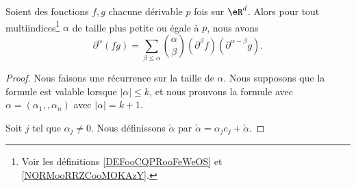 \begin{lemma}      \label{LEMooOLQTooEHJuBc}
	Soient des fonctions \( f,g\) chacune dérivable \( p\) fois sur \( \eR^d\). Alors pour tout multiindices\footnote{Voir les définitions \ref{DEFooCQPRooFeWeOS} et \ref{NORMooRRZCooMOKAzY}.} \( \alpha\) de taille plus petite ou égale à \( p\), nous avons
	\begin{equation}
		\partial^{\alpha}(fg)=\sum_{\beta\leq \alpha}\binom{ \alpha }{ \beta }(\partial^{\beta}f)(\partial^{\alpha-\beta}g).
	\end{equation}
\end{lemma}

\begin{proof}
	Nous faisons une récurrence sur la taille de \( \alpha\). Nous supposons que la formule est valable lorsque \( | \alpha |\leq k\), et nous prouvons la formule avec \( \alpha=(\alpha_1,,\alpha_n)\) avec \( | \alpha |=k+1\).

	Soit \( j\) tel que \( \alpha_j\neq 0\). Nous définissons \( \tilde \alpha\) par \( \tilde \alpha=\alpha_je_j+\tilde  \alpha\).


\end{proof}
